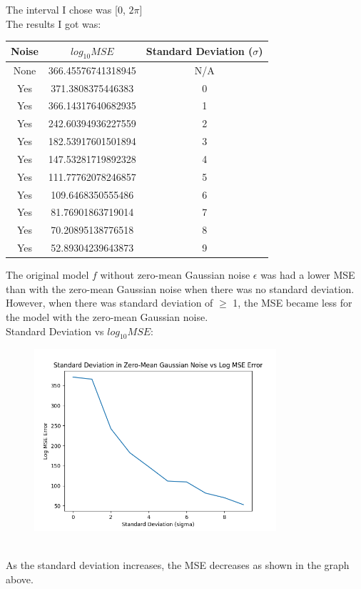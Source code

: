 \documentclass[a4paper]{article}
\theoremstyle{definition}
\newenvironment{soln}{
    \leavevmode\color{blue}\ignorespaces
}{}
\begin{document}
\begin{soln}
    The interval I chose was [$0$, $2\pi$] \\ 
    The results I got was: \\ 
    \begin{center}
    \begin{tabular}{ |c| c| c| }
        \hline Noise & $log_{10}MSE$ & Standard Deviation ($\sigma$) \\
        \hline None & 366.45576741318945 & N/A \\
        \hline Yes & 371.3808375446383 & 0 \\
        \hline Yes & 366.14317640682935 & 1\\
        \hline Yes & 242.60394936227559 & 2\\
        \hline Yes & 182.53917601501894 & 3\\
        \hline Yes & 147.53281719892328 & 4\\
        \hline Yes & 111.77762078246857 & 5\\
        \hline Yes & 109.6468350555486 & 6\\
        \hline Yes & 81.76901863719014 & 7\\
        \hline Yes & 70.20895138776518 & 8\\
        \hline Yes & 52.89304239643873 & 9\\
        \hline
    \end{tabular}
    \end{center}

    The original model $f$ without zero-mean Gaussian noise $\epsilon$ was had a lower MSE than with the zero-mean Gaussian noise when there was no standard deviation. However, when there was standard deviation of $\geq$ 1, the MSE became less for the model with the zero-mean Gaussian noise.  \\
    Standard Deviation vs $log_{10}MSE$:
    \begin{figure}[h!]
        \centering
        \includegraphics[width=0.8\textwidth]{images/stdevvslogmse.png}  
        \captionsetup{labelformat=empty}
        \caption{}
        \label{fig:mixed}
    \end{figure}
    \\ As the standard deviation increases, the MSE decreases as shown in the graph above.
\end{soln}



\end{document}
